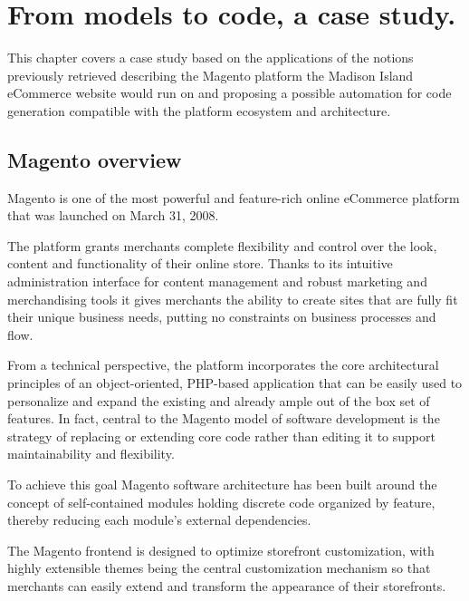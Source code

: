 \chead{}

\chapter{From models to code, a case study.}

This chapter covers a case study based on the applications of the notions previously retrieved describing the Magento platform the Madison Island eCommerce website would run on and proposing a possible automation for code generation compatible with the platform ecosystem and architecture.

\section{Magento overview}

Magento is one of the most powerful and feature-rich online eCommerce platform that was launched on March 31, 2008. 

The platform grants merchants complete flexibility and control over the look, content and functionality of their online store. Thanks to its intuitive administration interface for content management and robust marketing and merchandising tools it gives merchants the ability to create sites that are fully fit their unique business needs, putting no constraints on business processes and flow.

From a technical perspective, the platform incorporates the core architectural principles of an object-oriented, PHP-based application that can be easily used to personalize and expand the existing and already ample out of the box set of features.
In fact, central to the Magento model of software development is the strategy of replacing or extending core code rather than editing it to support maintainability and flexibility. 

To achieve this goal Magento software architecture has been built around the concept of self-contained modules holding discrete code organized by feature, thereby reducing each module’s external dependencies.

The Magento frontend is designed to optimize storefront customization, with highly extensible themes being the central customization mechanism so that merchants can easily extend and transform the appearance of their storefronts.

